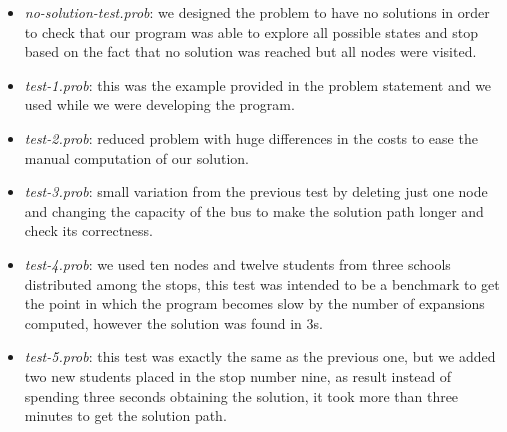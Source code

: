 \begin{itemize}
    \item[] \textit{no-solution-test.prob}: we designed the problem to have no solutions in order to check that our program was able to explore all possible states and stop based on the fact that no solution was reached but all nodes were visited.
    
    \item[] \textit{test-1.prob}: this was the example provided in the problem statement and we used while we were developing the program.
    
    \item[] \textit{test-2.prob}: reduced problem with huge differences in the costs to ease the manual computation of our solution.
    
    \item[] \textit{test-3.prob}: small variation from the previous test by deleting just one node and changing the capacity of the bus to make the solution path longer and check its correctness.
    
    \item[] \textit{test-4.prob}: we used ten nodes and twelve students from three schools distributed among the stops, this test was intended to be a benchmark to get the point in which the program becomes slow by the number of expansions computed, however the solution was found in 3s.
    
    \item[] \textit{test-5.prob}: this test was exactly the same as the previous one, but we added two new students placed in the stop number nine, as result instead of spending three seconds obtaining the solution, it took more than three minutes to get the solution path.
\end{itemize}